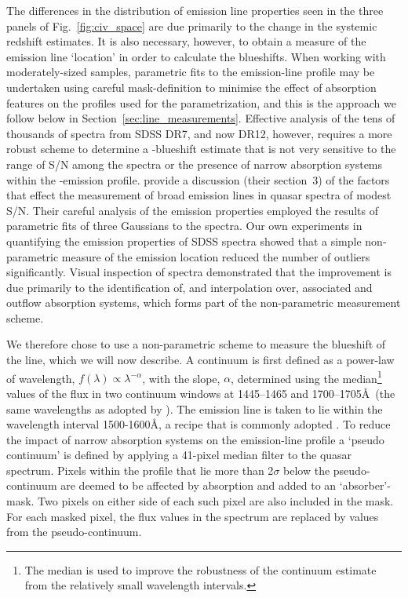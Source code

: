 The differences in the distribution of  emission line properties seen in the three panels of Fig.~\ref{fig:civ_space} are due primarily to the change in the systemic redshift estimates. 
It is also necessary, however, to obtain a measure of the  emission line `location' in order to calculate the blueshifts. 
When working with moderately-sized samples, parametric fits to the emission-line profile may be undertaken using careful mask-definition to minimise the effect of absorption features on the profiles used for the parametrization, and this is the approach we follow below in Section~\ref{sec:line_measurements}. 
Effective analysis of the tens of thousands of spectra from SDSS DR7, and now DR12, however, requires a more robust scheme to determine a -blueshift estimate that is not very sensitive to the range of S/N among the spectra or the presence of narrow absorption systems within the -emission profile. 
\citet{shen11} provide a discussion (their section~3) of the factors that effect the measurement of broad emission lines in quasar spectra of modest S/N. 
Their careful analysis of the  emission properties employed the results of parametric fits of three Gaussians to the spectra. 
Our own experiments in quantifying the  emission properties of SDSS spectra showed that a simple non-parametric measure of the  emission location reduced the number of outliers significantly. 
Visual inspection of spectra demonstrated that the improvement is due primarily to the identification of, and interpolation over, associated and outflow absorption systems, which forms part of the non-parametric measurement scheme. 

We therefore chose to use a non-parametric scheme to measure the blueshift of the  line, which we will now describe. 
A continuum is first defined as a power-law of wavelength, $f(\lambda) \propto \lambda^{-\alpha}$, with the slope, $\alpha$, determined using the median\footnote{The median is used to improve the robustness of the continuum estimate from the relatively small wavelength intervals.} values of the flux in two continuum windows at 1445--1465 and 1700--1705\AA\, (the same wavelengths as adopted by \citet{shen11}). 
The  emission line is taken to lie within the wavelength interval 1500-1600\AA, a recipe that is commonly adopted \citep[e.g.][]{shen11, denney13}. 
To reduce the impact of narrow absorption systems on the emission-line profile a `pseudo continuum' is defined by applying a 41-pixel median filter to the quasar spectrum.
Pixels within the  profile that lie more than 2$\sigma$ below the pseudo-continuum are deemed to be affected by absorption and added to an `absorber'-mask. 
Two pixels on either side of each such pixel are also included in the mask. 
For each masked pixel, the flux values in the spectrum are replaced by values from the pseudo-continuum. 

